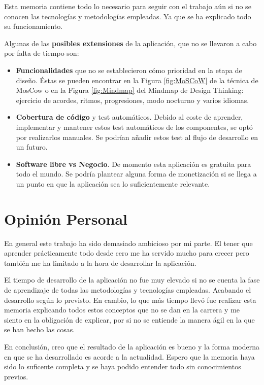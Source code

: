 \documentclass[12pt,twoside,titlepage]{report}
\begin{document}
Esta memoria contiene todo lo necesario para seguir con el trabajo aún si no se conocen las tecnologías y metodologías empleadas. Ya que se ha explicado todo su funcionamiento.

Algunas de las \textbf{posibles extensiones} de la aplicación, que no se llevaron a cabo por falta de tiempo son:

\begin{itemize}
    \item \textbf{Funcionalidades} que no se establecieron cómo prioridad en la etapa de diseño. Éstas se pueden encontrar en la Figura \ref{fig:MoSCoW} de la técnica de MosCow o en la Figura \ref{fig:Mindmap} del Mindmap de Design Thinking: ejercicio de acordes, ritmos, progresiones, modo nocturno y varios idiomas.
    \item \textbf{Cobertura de código} y test automáticos. Debido al coste de aprender, implementar y mantener estos test automáticos de los componentes, se optó por realizarlos manuales. Se podrían añadir estos test al flujo de desarrollo en un futuro.
    \item \textbf{Software libre vs Negocio}. De momento esta aplicación es gratuita para todo el mundo. Se podría plantear alguna forma de monetización si se llega a un punto en que la aplicación sea lo suficientemente relevante.
\end{itemize}

\section{Opinión Personal}
En general este trabajo ha sido demasiado ambicioso por mi parte. El tener que aprender prácticamente todo desde cero me ha servido mucho para crecer pero también me ha limitado a la hora de desarrollar la aplicación.

El tiempo de desarrollo de la aplicación no fue muy elevado si no se cuenta la fase de aprendizaje de todas las metodologías y tecnologías empleadas. Acabando el desarrollo según lo previsto. En cambio, lo que más tiempo llevó fue realizar esta memoria explicando todos estos conceptos que no se dan en la carrera y me siento en la obligación de explicar, por si no se entiende la manera ágil en la que se han hecho las cosas.

En conclusión, creo que el resultado de la aplicación es bueno y la forma moderna en que se ha desarrollado es acorde a la actualidad. Espero que la memoria haya sido lo suficente completa y se haya podido entender todo sin conocimientos previos.
\end{document}
